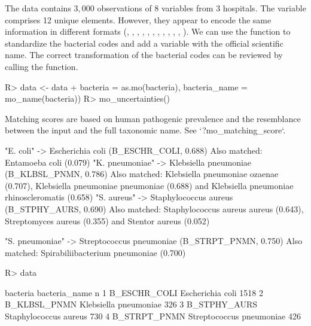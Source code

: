 \documentclass[article, shortnames]{jss}
\newcommand{\fct}[1]{\code{#1()}}
\begin{document}
%
The data contains $3,000$ observations of 8 variables from 3 hospitals.  The
 variable comprises 12 unique elements.  However, they appear to
encode the same information in different formats (, ,
, , , ,
, , ,
, \newline{},
).  We can use the \fct{as.mo} function
to standardize the bacterial codes and add a variable with the official
scientific name.  The correct transformation of the bacterial codes can be
reviewed by calling the \fct{mo\_uncertainties} function.
%
\begin{CodeChunk}
\begin{CodeInput}
R> data <- data %
+    bacteria = as.mo(bacteria), bacteria_name = mo_name(bacteria))
R> mo_uncertainties()
\end{CodeInput}
\begin{CodeOutput}
Matching scores are based on human pathogenic prevalence and the
resemblance between the input and the full taxonomic name. See
`?mo_matching_score`.

"E. coli" -> Escherichia coli (B_ESCHR_COLI, 0.688)
Also matched: Entamoeba coli (0.079)
"K. pneumoniae" -> Klebsiella pneumoniae (B_KLBSL_PNMN, 0.786)
Also matched: Klebsiella pneumoniae ozaenae (0.707), Klebsiella
              pneumoniae pneumoniae (0.688) and Klebsiella pneumoniae
              rhinoscleromatis (0.658)
"S. aureus" -> Staphylococcus aureus (B_STPHY_AURS, 0.690)
Also matched: Staphylococcus aureus aureus (0.643), Streptomyces
              aureus (0.355) and Stentor aureus (0.052)

"S. pneumoniae" -> Streptococcus pneumoniae (B_STRPT_PNMN, 0.750)
Also matched: Spirabiliibacterium pneumoniae (0.700)
\end{CodeOutput}
\begin{CodeInput}
R> data %
\end{CodeInput}
\begin{CodeOutput}
      bacteria            bacteria_name    n
1 B_ESCHR_COLI         Escherichia coli 1518
2 B_KLBSL_PNMN    Klebsiella pneumoniae  326
3 B_STPHY_AURS    Staphylococcus aureus  730
4 B_STRPT_PNMN Streptococcus pneumoniae  426
\end{CodeOutput}
\end{CodeChunk}
\end{document}
